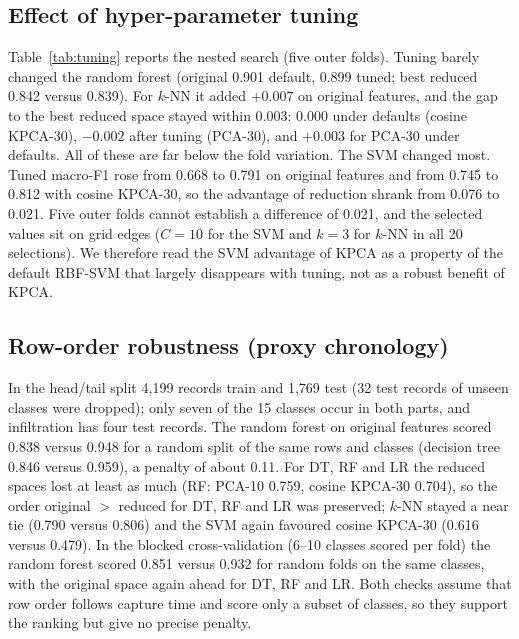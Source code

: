 \documentclass[runningheads]{llncs}
\begin{document}
\subsection{Effect of hyper-parameter tuning}
Table~\ref{tab:tuning} reports the nested search (five outer folds). Tuning barely changed the random forest (original 0.901 default, 0.899 tuned; best reduced 0.842 versus 0.839). For $k$-NN it added $+0.007$ on original features, and the gap to the best reduced space stayed within 0.003: 0.000 under defaults (cosine KPCA-30), $-0.002$ after tuning (PCA-30), and $+0.003$ for PCA-30 under defaults. All of these are far below the fold variation. The SVM changed most. Tuned macro-F1 rose from 0.668 to 0.791 on original features and from 0.745 to 0.812 with cosine KPCA-30, so the advantage of reduction shrank from 0.076 to 0.021. Five outer folds cannot establish a difference of 0.021, and the selected values sit on grid edges ($C=10$ for the SVM and $k=3$ for $k$-NN in all 20 selections). We therefore read the SVM advantage of KPCA as a property of the default RBF-SVM that largely disappears with tuning, not as a robust benefit of KPCA.

\begin{table}[htbp]
\caption{Nested hyper-parameter search: mean macro-F1 over five outer folds. For each setting (default, tuned) the best reduced space among PCA-30, KPCA-cos-30 and KPCA-RBF-30 is chosen by that setting\textquoteright s own score; $\Delta$ = original $-$ reduced (negative: reduction better). K-cos-30 = KPCA, cosine kernel, 30 components. The last column gives the default-setting gap measured in the tuned-best reduced space.}\label{tab:tuning}
\centering\scriptsize
\resizebox{\textwidth}{!}{}
\end{table}

\subsection{Row-order robustness (proxy chronology)}
In the head/tail split 4{,}199 records train and 1{,}769 test (32 test records of unseen classes were dropped); only seven of the 15 classes occur in both parts, and infiltration has four test records. The random forest on original features scored 0.838 versus 0.948 for a random split of the same rows and classes (decision tree 0.846 versus 0.959), a penalty of about 0.11. For DT, RF and LR the reduced spaces lost at least as much (RF: PCA-10 0.759, cosine KPCA-30 0.704), so the order original $>$ reduced for DT, RF and LR was preserved; $k$-NN stayed a near tie (0.790 versus 0.806) and the SVM again favoured cosine KPCA-30 (0.616 versus 0.479). In the blocked cross-validation (6--10 classes scored per fold) the random forest scored 0.851 versus 0.932 for random folds on the same classes, with the original space again ahead for DT, RF and LR. Both checks assume that row order follows capture time and score only a subset of classes, so they support the ranking but give no precise penalty.
\end{document}
